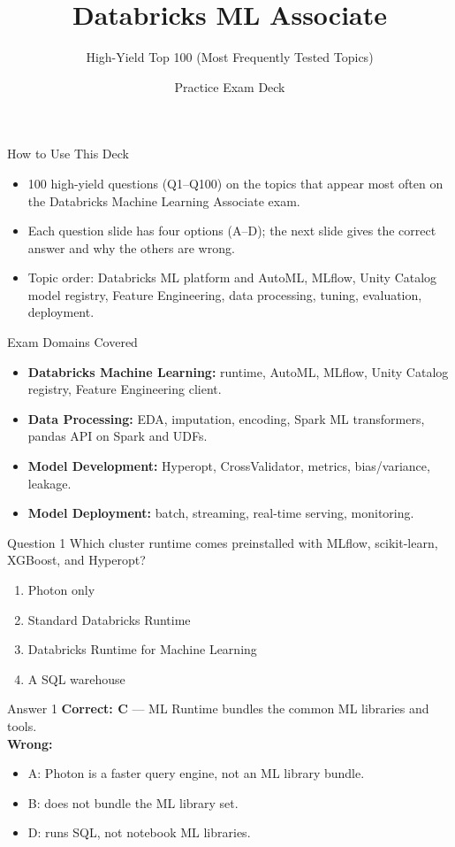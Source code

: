 \documentclass[aspectratio=169,11pt]{beamer}
\title{Databricks ML Associate}
\subtitle{High-Yield Top 100 (Most Frequently Tested Topics)}
\author{Practice Exam Deck}
\date{}
\begin{document}
	
	\begin{frame}
		\titlepage
	\end{frame}
	
	\begin{frame}{How to Use This Deck}
		\begin{itemize}
			\item 100 high-yield questions (Q1--Q100) on the topics that appear most often on the Databricks Machine Learning Associate exam.
			\item Each question slide has four options (A--D); the next slide gives the correct answer and why the others are wrong.
			\item Topic order: Databricks ML platform and AutoML, MLflow, Unity Catalog model registry, Feature Engineering, data processing, tuning, evaluation, deployment.
		\end{itemize}
	\end{frame}
	
	\begin{frame}{Exam Domains Covered}
		\begin{itemize}
			\item \textbf{Databricks Machine Learning:} runtime, AutoML, MLflow, Unity Catalog registry, Feature Engineering client.
			\item \textbf{Data Processing:} EDA, imputation, encoding, Spark ML transformers, pandas API on Spark and UDFs.
			\item \textbf{Model Development:} Hyperopt, CrossValidator, metrics, bias/variance, leakage.
			\item \textbf{Model Deployment:} batch, streaming, real-time serving, monitoring.
		\end{itemize}
	\end{frame}
	
	\begin{frame}{Question 1}
		Which cluster runtime comes preinstalled with MLflow, scikit-learn, XGBoost, and Hyperopt?
		\begin{enumerate}[label=\Alph*.]
			\item Photon only
			\item Standard Databricks Runtime
			\item Databricks Runtime for Machine Learning
			\item A SQL warehouse
		\end{enumerate}
	\end{frame}
	\begin{frame}{Answer 1}
		\textbf{Correct: C} --- ML Runtime bundles the common ML libraries and tools.\\
		\vspace{0.5em}
		\textbf{Wrong:}
		\begin{itemize}
			\item A: Photon is a faster query engine, not an ML library bundle.
			\item B: does not bundle the ML library set.
			\item D: runs SQL, not notebook ML libraries.
		\end{itemize}
	\end{frame}
	
\end{document}
